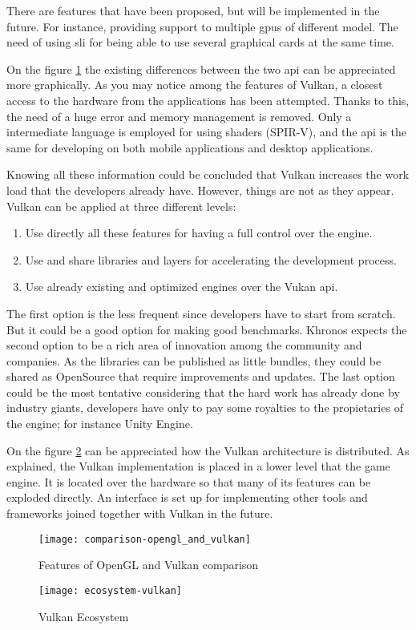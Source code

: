 There are features that have been proposed, but will be implemented in the future. For instance, providing support to
multiple \gls{gpu}s of different model. The need of using \gls{sli} for being able to use several graphical cards at
the same time.

On the figure \ref{fig:comparison_opengl_vulkan} the existing differences between the two \gls{api} can be appreciated
more graphically. As you may notice among the features of Vulkan, a closest access to the hardware from the applications
has been attempted. Thanks to this, the need of a huge error and memory management is removed. Only a intermediate
language is employed for using shaders (SPIR-V), and the \gls{api} is the same for developing on both mobile
applications and desktop applications.

Knowing all these information could be concluded that Vulkan increases the work load that the developers already have.
However, things are not as they appear. Vulkan can be applied at three different levels:

\begin{enumerate}
    \item Use directly all these features for having a full control over the engine.
    \item Use and share libraries and layers for accelerating the development process.
    \item Use already existing and optimized engines over the Vukan \gls{api}.
\end{enumerate}

The first option is the less frequent since developers have to start from scratch. But it could be a good option for
making good benchmarks. Khronos expects the second option to be a rich area of innovation among the community and
companies. As the libraries can be published as little bundles, they could be shared as OpenSource that require
improvements and updates. The last option could be the most tentative considering that the hard work has already
done by industry giants, developers have only to pay some royalties to the propietaries of the engine; for instance
Unity Engine.

On the figure \ref{fig:vulkan_ecosystem} can be appreciated how the Vulkan architecture is distributed. As explained,
the Vulkan implementation is placed in a lower level that the game engine. It is located over the hardware so that
many of its features can be exploded directly. An interface is set up for implementing other tools and frameworks
joined together with Vulkan in the future.

\begin{figure}[t]
	\begin{center}
		\texttt{[image: comparison-opengl\_and\_vulkan]}
		\caption{Features of OpenGL and Vulkan comparison}
		\label{fig:comparison_opengl_vulkan}
	\end{center}
\end{figure}
\begin{figure}[t]
	\begin{center}
		\texttt{[image: ecosystem-vulkan]}
		\caption{Vulkan Ecosystem}
		\label{fig:vulkan_ecosystem}
	\end{center}
\end{figure}

